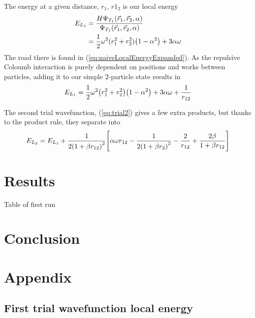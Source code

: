\documentclass[10pt]{revtex4-1}
\begin{document}
The energy at a given distance, $r_1$, $r1_2$ is our local energy
\begin{align}
    E_{L_1} &= \frac{H \Psi_{T_1} \qty(\vec{r}_1, \vec{r}_2, \alpha )}{\Psi_{T_1} \qty(\vec{r}_1, \vec{r}_2, \alpha )}\nonumber \\
        &= \frac{1}{2}\omega^2 (r_1^2 + r_2^2)\qty(1 -\alpha^2 ) + 3\alpha \omega \label{eq:naiveLocalEnergy}
\end{align}
The road there is found in (\ref{eq:naiveLocalEnergyExpanded}). As the repulsive Coloumb interaction is purely dependent on positions
and works between particles, adding it to our simple 2-particle state results in
\begin{align}
    E_{L_1} = \frac{1}{2} \omega^2 \qty(r_1^2 + r_2^2) \qty( 1 -\alpha^2 ) + 3\alpha \omega + \frac{1}{ r_{12} } \label{eq:firstLocalEnergy}
\end{align}

The second trial wavefunction, (\ref{eq:trial2}) gives a few extra products, but thanks to the product rule, they separate into
\begin{align}
    E_{L_2} = E_{L_1} + \frac{1}{ 2 \qty( 1 + \beta r_{12} )^{2} }
    \qty[ \alpha \omega r_{12} - \frac{ 1 }{ 2 \qty( 1 + \beta r_{2} )^{2} } - \frac{ 2 }{ r_{12} } + \frac{ 2 \beta }{ 1 + \beta r_{12} } ]
\end{align}


\section{Results}


\begin{table}[h!tb]
    \centering
    \caption{Table of first run}
\end{table}

\section{Conclusion}

\section{Appendix}

\subsection{First trial wavefunction local energy}
\end{document}
